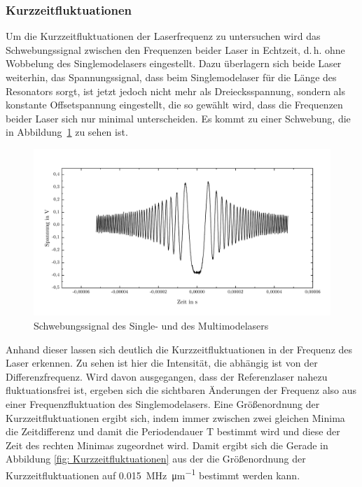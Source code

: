 \documentclass[a4paper,twoside,final]{article}
\begin{document}
\subsubsection{Kurzzeitfluktuationen}
Um die Kurzzeitfluktuationen der Laserfrequenz zu untersuchen wird das Schwebungssignal zwischen den Frequenzen beider Laser in Echtzeit, d.\,h. ohne Wobbelung des Singlemodelasers eingestellt. Dazu überlagern sich beide Laser weiterhin, das Spannungssignal, dass beim Singlemodelaser für die Länge des Resonators sorgt, ist jetzt jedoch nicht mehr als Dreiecksspannung, sondern als konstante Offsetspannung eingestellt, die so gewählt wird, dass die Frequenzen beider Laser sich nur minimal unterscheiden. Es kommt zu einer Schwebung, die in Abbildung~\ref{fig:Schwebung} zu sehen ist.

\begin{figure}[htp]
    \centering
        \includegraphics[width=1\textwidth]{Bilder/Schwebungssignal.pdf}
    \caption{Schwebungssignal des Single- und des Multimodelasers}
    \label{fig:Schwebung}
\end{figure}

Anhand dieser lassen sich deutlich die Kurzzeitfluktuationen in der Frequenz des Laser erkennen. Zu sehen ist hier die Intensität, die abhängig ist von der Differenzfrequenz. Wird davon ausgegangen, dass der Referenzlaser nahezu fluktuationsfrei ist, ergeben sich die sichtbaren Änderungen der Frequenz also aus einer Frequenzfluktuation des Singlemodelasers. Eine Größenordnung der Kurzzeitfluktuationen ergibt sich, indem immer zwischen zwei gleichen Minima die Zeitdifferenz und damit die Periodendauer T bestimmt wird und diese der Zeit des rechten Minimas zugeordnet wird. Damit ergibt sich die Gerade in Abbildung \ref{fig: Kurzzeitfluktuationen} aus der die Größenordnung der Kurzzeitfluktuationen auf \SI{0,015}{\mega\hertz\per\micro\meter} bestimmt werden kann.
\end{document}
